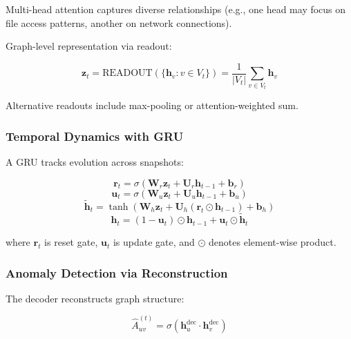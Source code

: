 \documentclass[conference]{IEEEtran}
\begin{document}
Multi-head attention captures diverse relationships (e.g., one head may focus on file access patterns, another on network connections).

Graph-level representation via readout:

\begin{equation}
\mathbf{z}_t = \text{READOUT}\left(\{\mathbf{h}_v : v \in V_t\}\right) = \frac{1}{|V_t|} \sum_{v \in V_t} \mathbf{h}_v
\end{equation}

Alternative readouts include max-pooling or attention-weighted sum.

\subsubsection{Temporal Dynamics with GRU}

A GRU tracks evolution across snapshots:

\begin{equation}
\mathbf{r}_t = \sigma(\mathbf{W}_r \mathbf{z}_t + \mathbf{U}_r \mathbf{h}_{t-1} + \mathbf{b}_r)
\end{equation}
\begin{equation}
\mathbf{u}_t = \sigma(\mathbf{W}_u \mathbf{z}_t + \mathbf{U}_u \mathbf{h}_{t-1} + \mathbf{b}_u)
\end{equation}
\begin{equation}
\tilde{\mathbf{h}}_t = \tanh(\mathbf{W}_h \mathbf{z}_t + \mathbf{U}_h (\mathbf{r}_t \odot \mathbf{h}_{t-1}) + \mathbf{b}_h)
\end{equation}
\begin{equation}
\mathbf{h}_t = (1 - \mathbf{u}_t) \odot \mathbf{h}_{t-1} + \mathbf{u}_t \odot \tilde{\mathbf{h}}_t
\end{equation}

where $\mathbf{r}_t$ is reset gate, $\mathbf{u}_t$ is update gate, and $\odot$ denotes element-wise product.

\subsubsection{Anomaly Detection via Reconstruction}

The decoder reconstructs graph structure:

\begin{equation}
\hat{A}_{uv}^{(t)} = \sigma\left(\mathbf{h}_u^{\text{dec}} \cdot \mathbf{h}_v^{\text{dec}}\right)
\end{equation}
\end{document}
